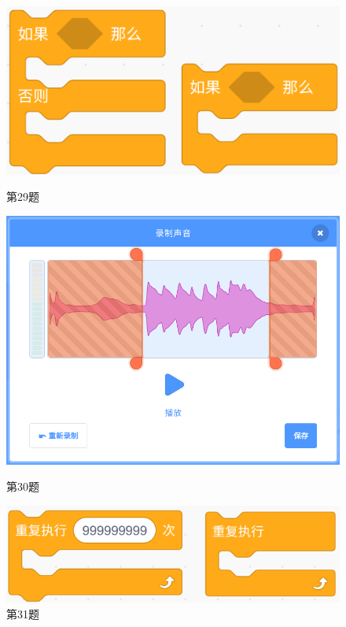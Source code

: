 \documentclass[10pt, a4paper]{article}
\begin{document}
\begin{enumerate}
        \begin{figure}[htbp]
            \centering
            \begin{minipage}[t]{.23\textwidth}
                \centering
                \includegraphics[width=\textwidth]{29.png}
                \caption*{第29题}
            \end{minipage}
            \begin{minipage}[t]{.25\textwidth}
                \centering
                \includegraphics[width=\textwidth]{30.png}
                \caption*{第30题}
            \end{minipage}
            \begin{minipage}[t]{.3\textwidth}
                \centering
                \includegraphics[width=\textwidth]{31.png}
                \caption*{第31题}
            \end{minipage}
        \end{figure}
        

\end{enumerate}
\end{document}
